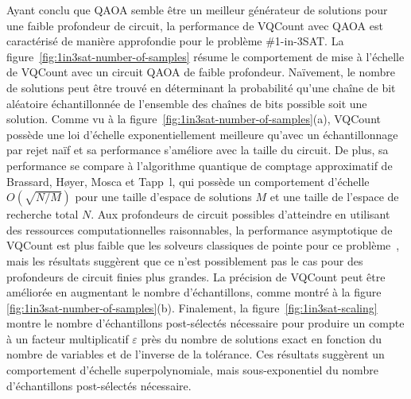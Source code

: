Ayant conclu que QAOA semble être un meilleur générateur de solutions pour une faible profondeur de circuit, la performance de VQCount avec QAOA est caractérisé de manière approfondie pour le problème \#1-in-3SAT. La figure~\ref{fig:1in3sat-number-of-samples} résume le comportement de mise à l'échelle de VQCount avec un circuit QAOA de faible profondeur. Naïvement, le nombre de solutions peut être trouvé en déterminant la probabilité qu'une chaîne de bit aléatoire échantillonnée de l'ensemble des chaînes de bits possible soit une solution. Comme vu à la figure~\ref{fig:1in3sat-number-of-samples}(a), VQCount possède une loi d'échelle exponentiellement meilleure qu'avec un échantillonnage par rejet naïf et sa performance s'améliore avec la taille du circuit. De plus, sa performance se compare à l'algorithme quantique de comptage approximatif de Brassard, H\o yer, Mosca et Tapp~\cite{brassardQuantumAmplitudeAmplification2002}l, qui possède un comportement d'échelle $O(\sqrt{N/M})$ pour une taille d'espace de solutions $M$ et une taille de l'espace de recherche total $N$. Aux profondeurs de circuit possibles d'atteindre en utilisant des ressources computationnelles raisonnables, la performance asymptotique de VQCount est plus faible que les solveurs classiques de pointe pour ce problème~\cite{kourtisFastCountingTensor2019}, mais les résultats suggèrent que ce n'est possiblement pas le cas pour des profondeurs de circuit finies plus grandes. La précision de VQCount peut être améliorée en augmentant le nombre d'échantillons, comme montré à la figure \ref{fig:1in3sat-number-of-samples}(b). Finalement, la figure~\ref{fig:1in3sat-scaling} montre le nombre d'échantillons post-sélectés nécessaire pour produire un compte à un facteur multiplicatif $\varepsilon$ près du nombre de solutions exact en fonction du nombre de variables et de l'inverse de la tolérance. Ces résultats suggèrent un comportement d'échelle superpolynomiale, mais sous-exponentiel du nombre d'échantillons post-sélectés nécessaire. 


